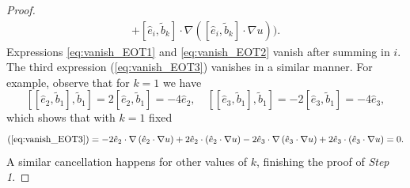 \documentclass[11pt]{amsart}
\numberwithin{equation}{section}
\begin{document}
\begin{proof}
\begin{align}
    +[\hat{e}_{i},\tilde{b}_{k}]\cdot\nabla\left([\hat{e}_{i},\tilde{b}_{k}]\cdot\nabla u\right)\Big).\label{eq:vanish_EOT3}
  \end{align}
  Expressions \eqref{eq:vanish_EOT1} and \eqref{eq:vanish_EOT2} vanish after summing in $i$. The third expression (\ref{eq:vanish_EOT3}) vanishes in a similar manner. For example, observe that for $k=1$ we have
  \begin{equation*}
    \left[[\hat{e}_{2},\tilde{b}_{1}],\tilde{b}_{1}\right]=2[\hat{e}_{2},\tilde{b}_{1}]=
    -4\hat{e}_{2},\quad\left[[\hat{e}_{3},\tilde{b}_{1}],\tilde{b}_{1}\right]=
    -2[\hat{e}_{3},\tilde{b}_{1}]=-4\hat{e}_{3},
  \end{equation*}
  which shows that with $k=1$ fixed
  \begin{equation*}
    (\ref{eq:vanish_EOT3})=
    -2\hat{e}_{2}\cdot\nabla\left(\hat{e}_{2}\cdot\nabla u\right)+2\hat{e}_{2}\cdot\left(\hat{e}_{2}\cdot\nabla u\right)
    -2\hat{e}_{3}\cdot\nabla\left(\hat{e}_{3}\cdot\nabla u\right)+2\hat{e}_{3}\cdot\left(\hat{e}_{3}\cdot\nabla u\right)=0.
  \end{equation*}
  A similar cancellation happens for other values of $k$, finishing the proof of {\em{Step 1}}.
\vspace{0.3cm}
%  


\end{proof}
\end{document}
